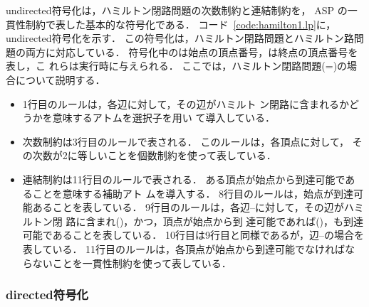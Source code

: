 

\textsf{undirected}符号化は，ハミルトン閉路問題の次数制約と連結制約を，
ASP の一貫性制約で表した基本的な符号化である．
コード~\ref{code:hamilton1.lp}に，\textsf{undirected}符号化を示す．
この符号化は，ハミルトン閉路問題とハミルトン路問題の両方に対応している．
符号化中のは始点の頂点番号，は終点の頂点番号を表し，こ
れらは実行時に与えられる．
ここでは，ハミルトン閉路問題(=)の場合について説明する．

\begin{itemize}
\item 1行目のルールは，各辺に対して，その辺がハミルト
  ン閉路に含まれるかどうかを意味するアトムを選択子を用い
  て導入している．
\item 次数制約は3行目のルールで表される．
  このルールは，各頂点に対して，
  その次数が2に等しいことを個数制約を使って表している．
\item 連結制約は11行目のルールで表される．
ある頂点が始点から到達可能であることを意味する補助アト
ムを導入する．
8行目のルールは，始点が到達可能あることを表している．
9行目のルールは，各辺--に対して，その辺がハミルトン閉
路に含まれ()，かつ，頂点が始点から到
達可能であれば()，も到達可能であることを表している．
10行目は9行目と同様であるが，辺--の場合を表している．
11行目のルールは，各頂点が始点から到達可能でなければな
らないことを一貫性制約を使って表している．
\end{itemize}

\subsubsection{\textsf{directed}符号化}



